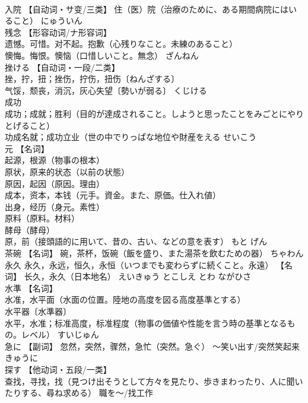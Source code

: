\documentclass[8pt]{extreport}
\begin{document}
\begin{CJK}{UTF8}{min}
\\	入院	【自动词・サ变/三类】 住（医）院（治療のために、ある期間病院にはいること）	にゅういん	
\\	残念	【形容动词/ナ形容词】 
\\	遗憾。可惜。对不起。抱歉（心残りなこと。未練のあること） 
\\	懊悔。悔恨。懊恼（口惜しいこと。無念）	ざんねん	
\\	挫ける	【自动词・一段/二类】 
\\	挫，拧，扭；挫伤，拧伤，扭伤〔ねんざする〕 
\\	气馁，颓丧，消沉，灰心失望〔勢いが弱る〕	くじける	
\\	成功	
\\	成功；成就；胜利（目的が達成されること。しようと思ったことをみごとにやりとげること） 
\\	功成名就；成功立业（世の中でりっぱな地位や財産をえる	せいこう	
\\	元	【名词】 
\\	起源，根源（物事の根本） 
\\	原状，原来的状态（以前の状態） 
\\	原因，起因（原因。理由） 
\\	成本，资本，本钱（元手。資金。また、原価。仕入れ値） 
\\	出身，经历（身元。素性） 
\\	原料（原料。材料） 
\\	酵母（酵母） 
\\	原，前（接頭語的に用いて、昔の、古い、などの意を表す）	もと げん	
\\	茶碗	【名词】 碗，茶杯，饭碗（飯を盛り、また湯茶を飲むための器）	ちゃわん	
\\	永久	永久，永远，恒久，永恒（いつまでも変わらずに続くこと。永遠） 【名词】 长久，永久（日本地名）	えいきゅう とこしえ とわ ながひさ	
\\	水準	【名词】 
\\	水准，水平面（水面の位置。陸地の高度を図る高度基準とする） 
\\	水平器〔水準器〕 
\\	水平，水准；标准高度，标准程度（物事の価値や性能を言う時の基準となるもの。レベル）	すいじゅん	
\\	急に	【副词】 忽然，突然，骤然，急忙（突然。急ぐ） 〜笑い出す/突然笑起来	きゅうに	
\\	探す	【他动词・五段/一类】 
\\	查找，寻找，找（見つけ出そうとして方々を見たり、歩きまわったり、人に聞いたりする、尋ね求める） 職を～/找工作 

\end{CJK}
\end{document}

